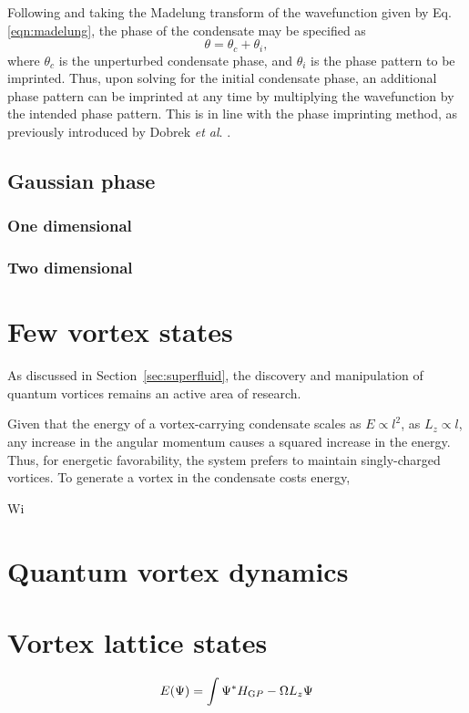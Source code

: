 Following \cite{BK:Pitaevskii_Stringari_2003} and taking the Madelung transform of the wavefunction given by Eq. \eqref{eqn:madelung}, the phase of the condensate may be specified as
\begin{equation}
\theta = \theta_c + \theta_i,
\end{equation}
where $\theta_c$ is the unperturbed condensate phase, and $\theta_i$ is the phase pattern to be imprinted. Thus, upon solving for the initial condensate phase, an additional phase pattern can be imprinted at any time by multiplying the wavefunction by the intended phase pattern. This is in line with the phase imprinting method, as previously introduced by Dobrek \textit{et al}. \cite{Vtx:Dobrek_pra_1999}.



\subsection{Gaussian phase}

\subsubsection{One dimensional}

\subsubsection{Two dimensional}



\section{Few vortex states}
As discussed in Section~\ref{sec:superfluid}, the discovery and manipulation of quantum vortices remains an active area of research.







Given that the energy of a vortex-carrying condensate scales as $E\propto l^2$, as $L_z \propto l$, any increase in the angular momentum causes a squared increase in the energy. Thus, for energetic favorability, the system prefers to maintain singly-charged vortices. To generate a vortex in the condensate costs energy,

Wi

\section{Quantum vortex dynamics}



\section{Vortex lattice states}
    \begin{equation}
        E(\Psi) = \int \Psi^{*} H_{\text GP} -\Omega L_z \Psi
    \end{equation}
